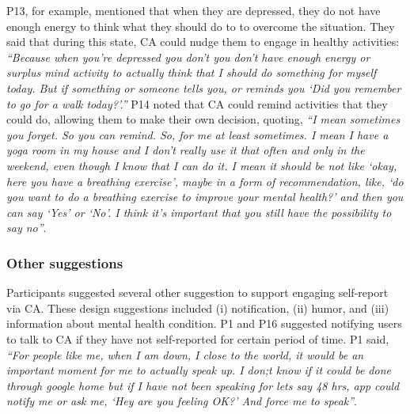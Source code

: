             P13, for example, mentioned that when they are depressed, they do not have enough energy to think what they should do to to overcome the situation. They said that during this state, \ac{CA} could nudge them to engage in healthy activities:
                \textit{``Because when you're depressed you don't you don't have enough energy or surplus mind activity to actually think that I should do something for myself today. But if something or someone tells you, or reminds you `Did you remember to go for a walk today?'.'' }
            P14 noted that \ac{CA} could remind activities that they could do, allowing them to make their own decision, quoting,
                \textit{``I mean sometimes you forget. So you can remind. So, for me at least sometimes. I mean I have a yoga room in my house and I don't really use it that often and only in the weekend, even though I know that I can do it. I mean it should be not like `okay, here you have a breathing exercise', maybe in a form of recommendation, like, `do you want to do a breathing exercise to improve your mental health?' and then you can say `Yes' or `No'. I think it's important that you still have the possibility to say no''}.

            
        \subsubsection{Other suggestions} 
            Participants suggested several other suggestion to support engaging self-report via \ac{CA}. These design suggestions included 
                (i) notification, 
                (ii) humor, and
                (iii) information about mental health condition.
            P1 and P16 suggested notifying users to talk to \ac{CA} if they have not self-reported for certain period of time.
            P1 said,
                \textit{``For people like me, when I am down, I close to the world, it would be an important moment for me to actually speak up. I don;t know if it could be done through google home but if I have not been speaking for lets say 48 hrs, \acl{app} could notify me or ask me, `Hey are you feeling OK?' And force me to speak''}.
                
